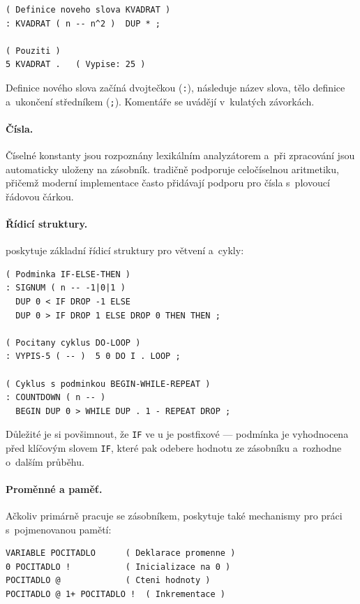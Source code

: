 \begin{lstlisting}[basicstyle=\small\ttfamily]
( Definice noveho slova KVADRAT )
: KVADRAT ( n -- n^2 )  DUP * ;

( Pouziti )
5 KVADRAT .   ( Vypise: 25 )
\end{lstlisting}

Definice nového slova začíná dvojtečkou (\texttt{:}), následuje
název slova, tělo definice a~ukončení středníkem (\texttt{;}).
Komentáře se uvádějí v~kulatých závorkách.

\paragraph{Čísla.}
Číselné konstanty jsou rozpoznány lexikálním analyzátorem a~při
zpracování jsou automaticky uloženy na zásobník. \Forth{} tradičně
podporuje celočíselnou aritmetiku, přičemž moderní implementace
často přidávají podporu pro čísla s~plovoucí řádovou čárkou.

\paragraph{Řídicí struktury.}
\Forth{} poskytuje základní řídicí struktury pro větvení a~cykly:

\begin{lstlisting}[basicstyle=\small\ttfamily]
( Podminka IF-ELSE-THEN )
: SIGNUM ( n -- -1|0|1 )
  DUP 0 < IF DROP -1 ELSE
  DUP 0 > IF DROP 1 ELSE DROP 0 THEN THEN ;

( Pocitany cyklus DO-LOOP )
: VYPIS-5 ( -- )  5 0 DO I . LOOP ;

( Cyklus s podminkou BEGIN-WHILE-REPEAT )
: COUNTDOWN ( n -- )
  BEGIN DUP 0 > WHILE DUP . 1 - REPEAT DROP ;
\end{lstlisting}

Důležité je si povšimnout, že \texttt{IF} ve \Forth{}u je postfixové ---
podmínka je vyhodnocena před klíčovým slovem \texttt{IF}, které
pak odebere hodnotu ze zásobníku a~rozhodne o~dalším průběhu.

\paragraph{Proměnné a paměť.}
Ačkoliv \Forth{} primárně pracuje se zásobníkem, poskytuje také
mechanismy pro práci s~pojmenovanou pamětí:

\begin{lstlisting}[basicstyle=\small\ttfamily]
VARIABLE POCITADLO      ( Deklarace promenne )
0 POCITADLO !           ( Inicializace na 0 )
POCITADLO @             ( Cteni hodnoty )
POCITADLO @ 1+ POCITADLO !  ( Inkrementace )
\end{lstlisting}

